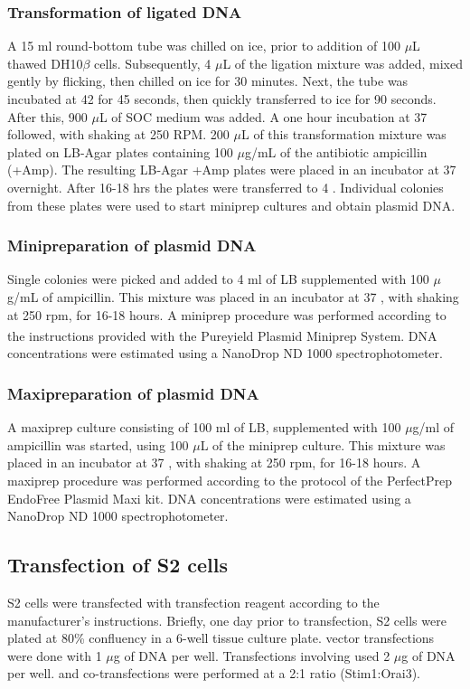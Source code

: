 \subsubsection{Transformation of ligated DNA}
A 15 ml round-bottom tube was chilled on ice, prior to addition of 100 $\mu$L thawed DH10$\beta$ cells. Subsequently, 4 $\mu$L of the ligation mixture was added, mixed gently by flicking, then chilled on ice for 30 minutes. Next, the tube was incubated at 42 \textcelsius{} for 45 seconds, then quickly transferred to ice for 90 seconds. After this, 900 $\mu$L of SOC medium was added. A one hour incubation at 37 \textcelsius{} followed, with shaking at 250 RPM. 200 $\mu$L of this transformation mixture was plated on LB-Agar plates containing 100 $\mu$g/mL of the antibiotic ampicillin (+Amp). The resulting LB-Agar +Amp plates were placed in an incubator at 37 \textcelsius{} overnight. After 16-18 hrs the plates were transferred to 4 \textcelsius{}. Individual colonies from these plates were used to start miniprep cultures and obtain plasmid DNA.

\subsubsection{Minipreparation of plasmid DNA}
Single colonies were picked and added to 4 ml of LB supplemented with 100 $\mu$g/mL of ampicillin. This mixture was placed in an incubator at 37 \textcelsius{}, with shaking at 250 rpm, for 16-18 hours. A miniprep procedure was performed according to the instructions provided with the Pureyield\textsuperscript{\texttrademark} Plasmid Miniprep System. DNA concentrations were estimated using a NanoDrop ND 1000 spectrophotometer.

\subsubsection{Maxipreparation of plasmid DNA}
A maxiprep culture consisting of 100 ml of LB, supplemented with 100 $\mu$g/ml of ampicillin was started, using 100 $\mu$L of the miniprep culture. This mixture was placed in an incubator at 37 \textcelsius{}, with shaking at 250 rpm, for 16-18 hours. A maxiprep procedure was performed according to the protocol of the PerfectPrep EndoFree Plasmid Maxi kit. DNA concentrations were estimated using a NanoDrop ND 1000 spectrophotometer.


\subsection{Transfection of S2 cells}
S2 cells were transfected with \transit transfection reagent according to the manufacturer's instructions. Briefly, one day prior to transfection, S2 cells were plated at 80\% confluency in a 6-well tissue culture plate. \oraiiiivector{} vector transfections were done with 1 $\mu$g of DNA per well. Transfections involving \stimivector{} used 2 $\mu$g of DNA per well. \stimivector{} and \oraiiiivector{} co-transfections were performed at a 2:1 ratio (Stim1:Orai3). 

